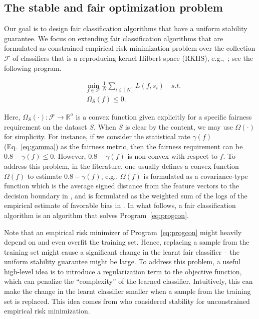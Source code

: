 \documentclass[11pt]{article}
\newcommand{\R}{\mathbb{R}}
\newcommand{\calF}{\mathcal{F}}
\begin{document}
	
	\subsection{The stable and fair optimization problem}
	\label{sec:model}
	
	Our goal is to design fair classification algorithms that have a uniform stability guarantee.
	We focus on extending fair classification algorithms that are formulated as constrained empirical risk minimization problem over the collection  $\calF$ of classifiers that is a reproducing kernel Hilbert space (RKHS), e.g.,~\cite{zafar2017fair,zafar2017fairness,goel2018non}; see the following program.
	
	\begin{tcolorbox}
		\begin{equation} \tag{ConFair}
		\label{eq:progcon}
		\begin{split}
		& \min_{f\in \calF} \frac{1}{N}\sum_{i\in [N]} L(f,s_i) \quad s.t. \\
		& ~ \Omega_S(f)\leq 0.
		\end{split}
		\end{equation}
	\end{tcolorbox}
	
	\noindent
	Here, $\Omega_S(\cdot): \calF\rightarrow \R^a$ is a convex function given explicitly for a specific fairness requirement on the dataset $S$. 
	When $S$ is clear by the content, we may use $\Omega(\cdot)$ for simplicity.
	For instance, if we consider the statistical rate $\gamma(f)$ (Eq.~\eqref{eq:gamma}) as the fairness metric, then the fairness requirement can be $0.8-\gamma(f)\leq 0$.
	However, $0.8-\gamma(f)$ is non-convex with respect to $f$.
	To address this problem, in the literature, one usually defines a convex function $\Omega(f)$ to estimate $0.8-\gamma(f)$, e.g., $\Omega(f)$ is formulated as a covariance-type function which is the average signed distance from
	the feature vectors to the decision boundary in \cite{zafar2017fairness}, and is formulated as the weighted sum of the logs of the empirical estimate of favorable bias in \cite{goel2018non}.
	In what follows,	a fair classification algorithm is an algorithm that  solves Program~\eqref{eq:progcon}.
	
	Note that an empirical risk minimizer of Program~\eqref{eq:progcon} might heavily depend on and even overfit the training set. 
	Hence, replacing a sample from the training set might cause a significant change in the learnt fair classifier -- the uniform stability guarantee might be large.
	To address this problem, a useful high-level idea is to introduce a regularization term to the objective function, which can penalize the
	``complexity'' of the learned classifier.
	Intuitively, this can make the change in the learnt classifier smaller when a sample from the training set is replaced.
	This idea comes from \cite{bousquet2002stability} who considered stability for unconstrained empirical risk minimization.
	
\end{document}

